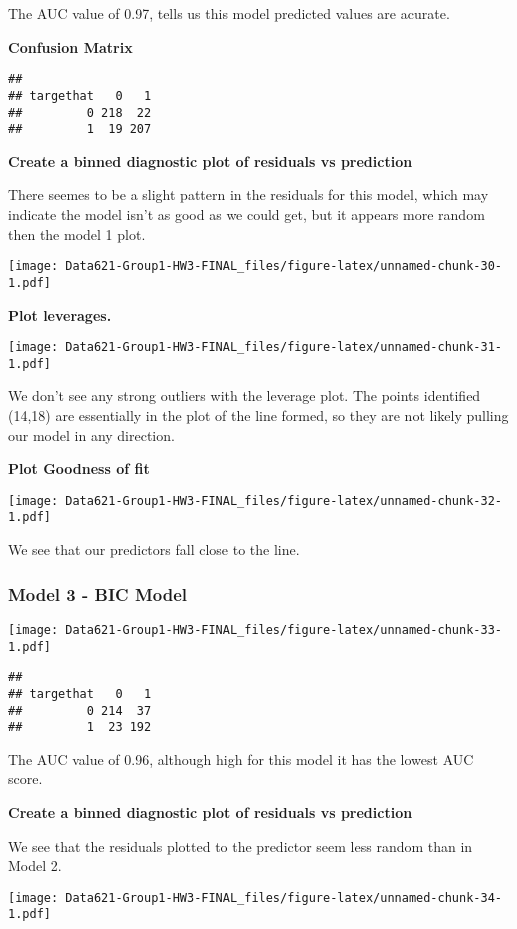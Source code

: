 \documentclass[
]{article}
\begin{document}
The AUC value of 0.97, tells us this model predicted values are acurate.

\textbf{Confusion Matrix}

\begin{verbatim}
##          
## targethat   0   1
##         0 218  22
##         1  19 207
\end{verbatim}

\textbf{Create a binned diagnostic plot of residuals vs prediction}

There seemes to be a slight pattern in the residuals for this model,
which may indicate the model isn't as good as we could get, but it
appears more random then the model 1 plot.

\texttt{[image: Data621-Group1-HW3-FINAL\_files/figure-latex/unnamed-chunk-30-1.pdf]}

\textbf{Plot leverages.}

\texttt{[image: Data621-Group1-HW3-FINAL\_files/figure-latex/unnamed-chunk-31-1.pdf]}

We don't see any strong outliers with the leverage plot. The points
identified (14,18) are essentially in the plot of the line formed, so
they are not likely pulling our model in any direction.

\textbf{Plot Goodness of fit}

\texttt{[image: Data621-Group1-HW3-FINAL\_files/figure-latex/unnamed-chunk-32-1.pdf]}

We see that our predictors fall close to the line.

\hypertarget{model-3---bic-model}{%
\subsubsection{Model 3 - BIC Model}\label{model-3---bic-model}}

\texttt{[image: Data621-Group1-HW3-FINAL\_files/figure-latex/unnamed-chunk-33-1.pdf]}

\begin{verbatim}
##          
## targethat   0   1
##         0 214  37
##         1  23 192
\end{verbatim}

The AUC value of 0.96, although high for this model it has the lowest
AUC score.

\textbf{Create a binned diagnostic plot of residuals vs prediction}

We see that the residuals plotted to the predictor seem less random than
in Model 2.

\texttt{[image: Data621-Group1-HW3-FINAL\_files/figure-latex/unnamed-chunk-34-1.pdf]}
\end{document}
